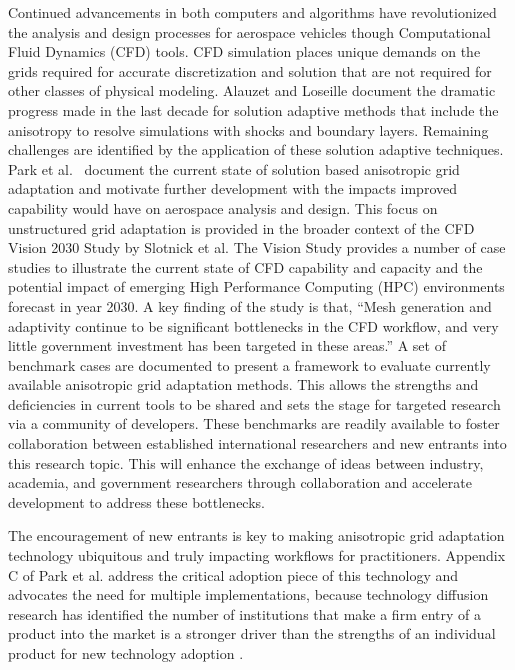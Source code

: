 \documentclass[3p,times,procedia,number]{elsarticle}
\begin{document}
Continued advancements in both computers and algorithms
have revolutionized the analysis and design processes for
aerospace vehicles though Computational Fluid Dynamics (CFD) tools.
CFD simulation places unique demands on the grids required for
accurate discretization and solution that are not required
for other classes of physical modeling.
Alauzet and Loseille \cite{alauzet-loseille-decade-aniso-adapt-cfd}
document the dramatic progress made in the last decade
for solution adaptive methods that include the anisotropy to
resolve simulations with shocks and boundary layers.
Remaining challenges are identified
by the application of these solution adaptive techniques.
Park et al. \cite{park-unstruct-adapt-status-cfd2030}~document
the current state of solution based anisotropic
grid adaptation and motivate further development with
the impacts improved capability would have on
aerospace analysis and design.
This focus on unstructured grid adaptation
is provided in the broader context of the
CFD Vision 2030 Study by Slotnick et al. \cite{cfd-vision-2030}
The Vision Study provides a number of case studies
to illustrate the current state of CFD capability and capacity and the
potential impact of emerging High Performance Computing (HPC)
environments forecast in year 2030.
A key finding of the study is that,
``Mesh generation and adaptivity continue to be significant bottlenecks
in the CFD workflow, and very little government investment has been targeted
in these areas.''\cite{cfd-vision-2030}
A set of benchmark cases are documented to present a framework to evaluate
currently available anisotropic grid adaptation methods.
This allows the strengths and deficiencies in current tools to be shared
and sets the stage for targeted research via a community of developers.
These benchmarks are readily available to foster collaboration
between established international researchers and new
entrants into this research topic.
This will enhance the exchange of ideas between
industry, academia, and government researchers through collaboration
and accelerate development to address these bottlenecks.

The encouragement of new entrants is key to making
anisotropic grid adaptation technology ubiquitous and truly impacting
workflows for practitioners.
Appendix C of Park et al. \cite{park-unstruct-adapt-status-cfd2030}
address the critical adoption piece of this technology and
advocates the need for multiple implementations,
because technology diffusion research has identified the
number of institutions that make a firm entry of a product
into the market is a stronger driver than the strengths of an individual
product for new technology
adoption \cite{agarwal-bayus-market-evo-takeoff-innovation}.
\end{document}
